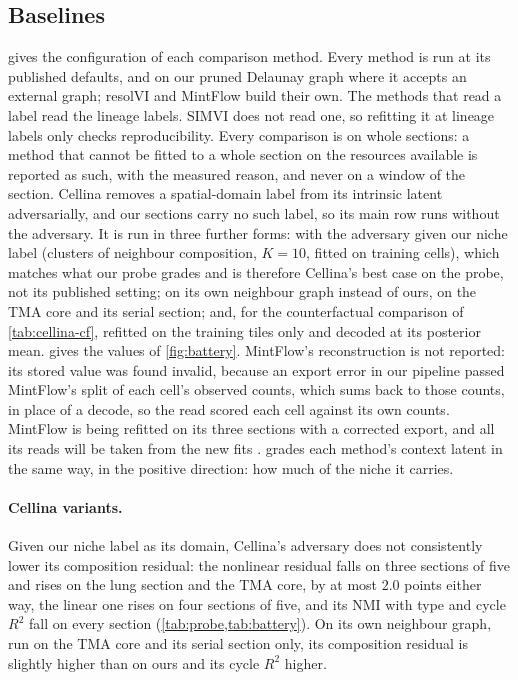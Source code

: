 \subsection{Baselines}
\label{app:baselines}

 gives the configuration of each comparison method. Every method is run at its published defaults, and on our pruned Delaunay graph where it accepts an external graph; resolVI and MintFlow build their own. The methods that read a label read the lineage labels. SIMVI does not read one, so refitting it at lineage labels only checks reproducibility. Every comparison is on whole sections: a method that cannot be fitted to a whole section on the resources available is reported as such, with the measured reason, and never on a window of the section. Cellina removes a spatial-domain label from its intrinsic latent adversarially, and our sections carry no such label, so its main row runs without the adversary. It is run in three further forms: with the adversary given our niche label (clusters of neighbour composition, $K = 10$, fitted on training cells), which matches what our probe grades and is therefore Cellina's best case on the probe, not its published setting; on its own neighbour graph instead of ours, on the TMA core and its serial section; and, for the counterfactual comparison of \cref{tab:cellina-cf}, refitted on the training tiles only and decoded at its posterior mean.  gives the values of \cref{fig:battery}. MintFlow's reconstruction is not reported: its stored value was found invalid, because an export error in our pipeline passed MintFlow's split of each cell's observed counts, which sums back to those counts, in place of a decode, so the read scored each cell against its own counts. MintFlow is being refitted on its three sections with a corrected export, and all its reads will be taken from the new fits .  grades each method's context latent in the same way, in the positive direction: how much of the niche it carries.

\paragraph{Cellina variants.} Given our niche label as its domain, Cellina's adversary does not consistently lower its composition residual: the nonlinear residual falls on three sections of five and rises on the lung section and the TMA core, by at most $2.0$ points either way, the linear one rises on four sections of five, and its NMI with type and cycle $R^2$ fall on every section (\cref{tab:probe,tab:battery}). On its own neighbour graph, run on the TMA core and its serial section only, its composition residual is slightly higher than on ours and its cycle $R^2$ higher.

